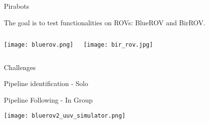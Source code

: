 \begin{frame}[t]{Pirabots}

    The goal is to test functionalities on ROVs: BlueROV and BirROV.

    \begin{columns}
    \begin{center}

        \texttt{[image: bluerov.png]}

    \end{center}

    \vspace*{0.3cm}
    \begin{center}

        \texttt{[image: bir\_rov.jpg]}

    \end{center}

\end{columns}

\end{frame}




\begin{frame}[t]{Challenges}

   
Pipeline identification - Solo

Pipeline Following - In Group
\vspace*{0.1cm}
\begin{center}

    \texttt{[image: bluerov2\_uuv\_simulator.png]}

\end{center}
    
    
            
\end{frame}



